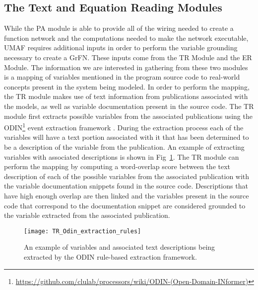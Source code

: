 \subsection{The Text and Equation Reading Modules \label{sec:ter_overview}}
While the PA module is able to provide all of the wiring needed to create a function network and the computations needed to make the network executable, UMAF requires additional inputs in order to perform the variable grounding necessary to create a GrFN.
These inputs come from the TR Module and the ER Module.
The information we are interested in gathering from these two modules is a mapping of variables mentioned in the program source code to real-world concepts present in the system being modeled.
In order to perform the mapping, the TR module makes use of text information from publications associated with the models, as well as variable documentation present in the source code.
The TR module first extracts possible variables from the associated publications using the ODIN\footnote{\url{https://github.com/clulab/processors/wiki/ODIN-(Open-Domain-INformer)}} event extraction framework \citep{valenzuela2015Odin}.
During the extraction process each of the variables will have a text portion associated with it that has been determined to be a description of the variable from the publication.
An example of extracting variables with associated descriptions is shown in Fig~\ref{fig:odin_extraction_example}.
The TR module can perform the mapping by computing a word-overlap score between the text description of each of the possible variables from the associated publication with the variable documentation snippets found in the source code.
Descriptions that have high enough overlap are then linked and the variables present in the source code that correspond to the documentation snippet are considered grounded to the variable extracted from the associated publication.

\begin{figure}[!htbp]
    \centering
    \texttt{[image: TR\_Odin\_extraction\_rules]}%
    \caption[Example Variable Extraction via ODIN]{An example of variables and associated text descriptions being extracted by the ODIN rule-based extraction framework.}
    \label{fig:odin_extraction_example}
\end{figure}

